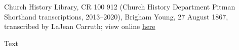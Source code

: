 					Church History Library, CR 100 912 (Church History Department Pitman Shorthand transcriptions, 2013--2020), Brigham Young, 27 August 1867, transcribed by LaJean Carruth; view online \href{https://catalog.churchofjesuschrist.org/assets/745f0c43-09af-45be-bb11-035bbb520a88/0/0}{here}
				
				\begin{description}
					\item[Text]
				\end{description}
				
